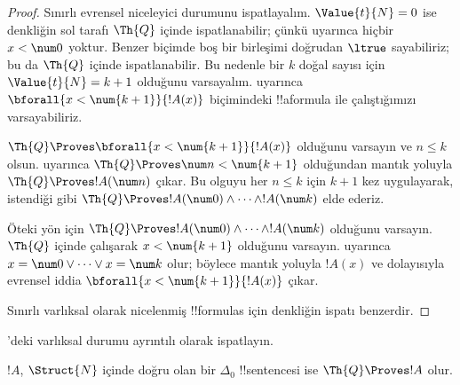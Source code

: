 \documentclass[../../../include/open-logic-section]{subfiles}
\begin{document}
\begin{proof}
    Sınırlı evrensel niceleyici durumunu ispatlayalım.
    $\Value{t}{N}=0$ ise denkliğin sol tarafı $\Th{Q}$ içinde
    ispatlanabilir; çünkü  uyarınca
    hiçbir $x<\num 0$ yoktur. Benzer biçimde boş bir birleşimi doğrudan
    $\ltrue$ sayabiliriz; bu da $\Th{Q}$ içinde ispatlanabilir.
    Bu nedenle bir $k$ doğal sayısı için $\Value{t}{N}=k+1$ olduğunu
    varsayalım.  uyarınca
    $\bforall{x<\num{k+1}}{!A(x)}$ biçimindeki !!a{formula} ile
    çalıştığımızı varsayabiliriz.

    $\Th{Q} \Proves \bforall{x<\num{k+1}}{!A(x)}$ olduğunu varsayın ve
    $n\leq k$ olsun.  uyarınca
    $\Th{Q} \Proves \num n<\num{k+1}$ olduğundan mantık yoluyla
    $\Th{Q} \Proves !A(\num n)$ çıkar. Bu olguyu her $n\leq k$ için
    $k+1$ kez uygulayarak, istendiği gibi
    $\Th{Q} \Proves !A(\num 0)\land\dots\land !A(\num k)$ elde ederiz.

    Öteki yön için $\Th{Q} \Proves
    !A(\num 0)\land\dots\land !A(\num k)$ olduğunu varsayın. $\Th{Q}$
    içinde çalışarak $x<\num{k+1}$ olduğunu varsayın.
     uyarınca
    $x=\num 0\lor\dots\lor x=\num k$ olur; böylece mantık yoluyla $!A(x)$
    ve dolayısıyla evrensel iddia $\bforall{x<\num{k+1}}{!A(x)}$ çıkar.

    Sınırlı varlıksal olarak nicelenmiş !!{formula}s için denkliğin ispatı
    benzerdir.
\end{proof}

\begin{prob}
'deki varlıksal durumu ayrıntılı olarak
ispatlayın.
\end{prob}

\begin{lem}
$!A$, $\Struct{N}$ içinde doğru olan bir $\Delta_0$ !!{sentence}{}si ise
$\Th{Q} \Proves !A$ olur.
\end{lem}
\end{document}
